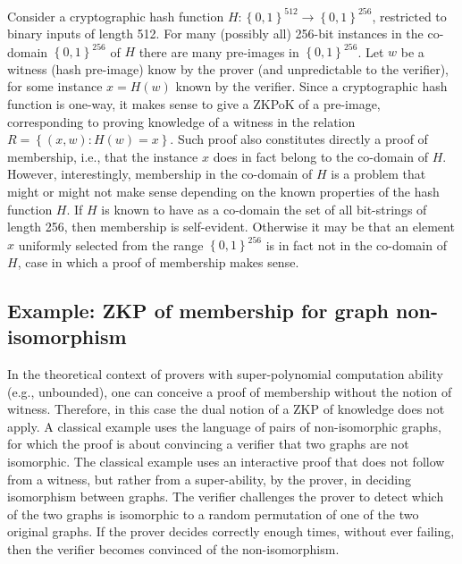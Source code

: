 	Consider a cryptographic hash function $H: \left\{0,1\right\}^{512} \rightarrow \left\{0,1\right\}^{256}$, restricted to binary inputs of length 512. 
	For many (possibly all) 256-bit instances in the co-domain $\left\{0,1\right\}^{256}$ of $H$ there are many pre-images in $\left\{0,1\right\}^{256}$.
	Let $w$ be a witness (hash pre-image) know by the prover (and unpredictable to the verifier), for some instance $x=H(w)$ known by the verifier.
	Since a cryptographic hash function is one-way, it makes sense to give a ZKPoK of a pre-image, corresponding to proving knowledge of a witness in the relation $R = \left\{(x,w): H(w)=x\right\}$.
	Such proof also constitutes directly a proof of membership, i.e., that the instance $x$ does in fact belong to the co-domain of $H$.
	However, interestingly, membership in the co-domain of $H$ is a problem that might or might not make sense depending on the known properties of the hash function $H$.
	If $H$ is known to have as a co-domain the set of all bit-strings of length 256, then membership is self-evident.
	Otherwise it may be that an element $x$ uniformly selected from the range $\left\{0,1\right\}^{256}$ is in fact not in the co-domain of $H$, case in which a proof of membership makes sense.



\subsection{Example: ZKP of membership for graph non-isomorphism}
\label{security:zkp-knowledge-vs-membership:ZKPoM-GNI}

	In the theoretical context of provers with super-polynomial computation ability (e.g., unbounded), one can conceive a proof of membership without the notion of witness.
Therefore, in this case the dual notion of a ZKP of knowledge does not apply.
	A classical example uses the language of pairs of non-isomorphic graphs,  %
for which the proof is about convincing a verifier that two graphs are not isomorphic.
	The classical example uses an interactive proof that does not follow from a witness, but rather from a super-ability, by the prover, in deciding isomorphism between graphs.
	The verifier challenges the prover to detect which of the two graphs is isomorphic to a random permutation of one of the two original graphs.
    If the prover decides correctly enough times, without ever failing, then the verifier becomes convinced of the non-isomorphism.

